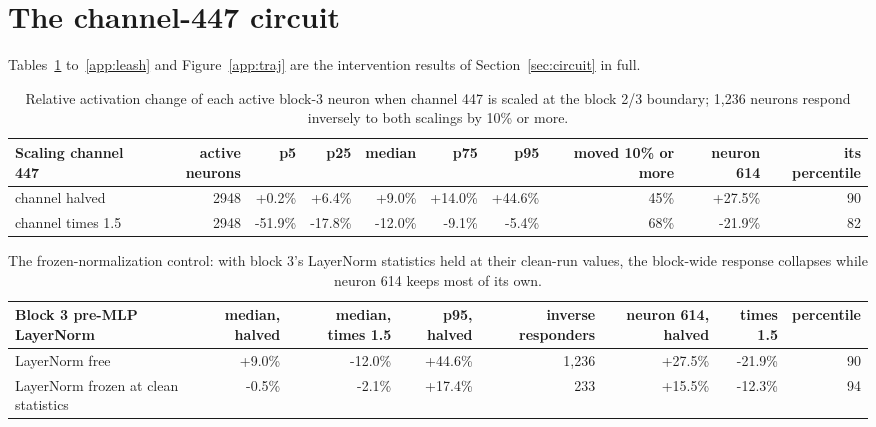 \section{The channel-447 circuit}\label{app:circuit}
Tables~\ref{app:dose} to~\ref{app:leash} and Figure~\ref{app:traj} are the intervention results of Section~\ref{sec:circuit} in full.
\begin{table}[H]\centering\footnotesize
\caption{Relative activation change of each active block-3 neuron when channel 447 is scaled at the block 2/3 boundary; 1,236 neurons respond inversely to both scalings by 10\% or more.}\label{app:dose}
\begin{adjustbox}{max width=\linewidth}
\begin{tabular}{lrrrrrrrrr}\toprule
Scaling channel 447 & active neurons & p5 & p25 & median & p75 & p95 & moved 10\% or more & neuron 614 & its percentile \\ \midrule
channel halved & 2948 & +0.2\% & +6.4\% & +9.0\% & +14.0\% & +44.6\% & 45\% & +27.5\% & 90 \\
channel times 1.5 & 2948 & -51.9\% & -17.8\% & -12.0\% & -9.1\% & -5.4\% & 68\% & -21.9\% & 82 \\
\bottomrule\end{tabular}\end{adjustbox}
\end{table}
\begin{table}[H]\centering\footnotesize
\caption{The frozen-normalization control: with block 3's LayerNorm statistics held at their clean-run values, the block-wide response collapses while neuron 614 keeps most of its own.}\label{app:frozen}
\begin{adjustbox}{max width=\linewidth}
\begin{tabular}{lrrrrrrr}\toprule
Block 3 pre-MLP LayerNorm & median, halved & median, times 1.5 & p95, halved & inverse responders & neuron 614, halved & times 1.5 & percentile \\ \midrule
LayerNorm free & +9.0\% & -12.0\% & +44.6\% & 1,236 & +27.5\% & -21.9\% & 90 \\
LayerNorm frozen at clean statistics & -0.5\% & -2.1\% & +17.4\% & 233 & +15.5\% & -12.3\% & 94 \\
\bottomrule\end{tabular}\end{adjustbox}
\end{table}
